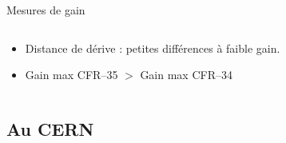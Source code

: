 \begin{frame}{Mesures de gain}
\begin{scriptsize}
\begin{columns}
\begin{column}{0.58\textwidth}
\begin{itemize}
    					\item Distance de dérive : petites différences à faible gain.
    					\item  Gain max CFR--35 $>$ Gain max CFR--34
    				\end{itemize}
    			\end{column}
    		\end{columns}
    	\end{scriptsize}
    \end{frame}
    
    \subsection{Au CERN}

    {
    	\setlength\pdfpagewidth{12.8cm}%
    	\setlength\pdfpageheight{9cm}%
    	\begin{frame}[plain]
    	\end{frame}
    }
    {
       	\setlength\pdfpagewidth{12.8cm}%
       	\setlength\pdfpageheight{9cm}%
       	\begin{frame}[plain]
       	\end{frame}
    }

